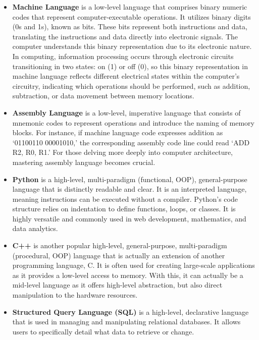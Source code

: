 \documentclass[
  letterpaper,
  DIV=11,
  numbers=noendperiod]{scrreprt}
\providecommand{\tightlist}{%
  \setlength{\itemsep}{0pt}\setlength{\parskip}{0pt}}\usepackage{longtable,booktabs,array}
\begin{document}
\begin{itemize}
\tightlist
\item
  \textbf{Machine Language} is a low-level language that comprises
  binary numeric codes that represent computer-executable operations. It
  utilizes binary digits (0s and 1s), known as bits. These bits
  represent both instructions and data, translating the instructions and
  data directly into electronic signals. The computer understands this
  binary representation due to its electronic nature. In computing,
  information processing occurs through electronic circuits
  transitioning in two states: on (1) or off (0), so this binary
  representation in machine language reflects different electrical
  states within the computer's circuitry, indicating which operations
  should be performed, such as addition, subtraction, or data movement
  between memory locations.
\item
  \textbf{Assembly Language} is a low-level, imperative language that
  consists of mnemonic codes to represent operations and introduce the
  naming of memory blocks. For instance, if machine language code
  expresses addition as `01100110 00001010,' the corresponding assembly
  code line could read `ADD R2, R0, R1.' For those delving more deeply
  into computer architecture, mastering assembly language becomes
  crucial.
\item
  \textbf{Python} is a high-level, multi-paradigm (functional, OOP),
  general-purpose language that is distinctly readable and clear. It is
  an interpreted language, meaning instructions can be executed without
  a compiler. Python's code structure relies on indentation to define
  functions, loops, or classes. It is highly versatile and commonly used
  in web development, mathematics, and data analytics.
\item
  \textbf{C++} is another popular high-level, general-purpose,
  multi-paradigm (procedural, OOP) language that is actually an
  extension of another programming language, C. It is often used for
  creating large-scale applications as it provides a low-level access to
  memory. With this, it can actually be a mid-level language as it
  offers high-level abstraction, but also direct manipulation to the
  hardware resources.
\item
  \textbf{Structured Query Language (SQL)} is a high-level, declarative
  language that is used in managing and manipulating relational
  databases. It allows users to specifically detail what data to
  retrieve or change.
\end{itemize}
\end{document}
